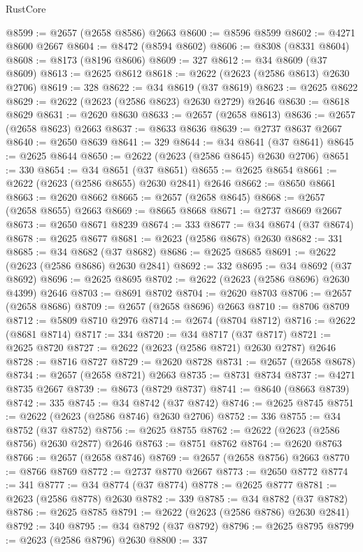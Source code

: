 \begin{lexlean}{RustCore}
\begin{coremodule}
@8599 := @2657 (@2658 @8586) @2663
@8600 := @8596 @8599
@8602 := @4271 @8600 @2667
@8604 := @8472 (@8594 @8602)
@8606 := @8308 (@8331 @8604)
@8608 := @8173 (@8196 @8606)
@8609 := 327
@8612 := @34 @8609 (@37 @8609)
@8613 := @2625 @8612
@8618 := @2622 (@2623 (@2586 @8613) @2630 @2706)
@8619 := 328
@8622 := @34 @8619 (@37 @8619)
@8623 := @2625 @8622
@8629 := @2622 (@2623 (@2586 @8623) @2630 @2729) @2646
@8630 := @8618 @8629
@8631 := @2620 @8630
@8633 := @2657 (@2658 @8613)
@8636 := @2657 (@2658 @8623) @2663
@8637 := @8633 @8636
@8639 := @2737 @8637 @2667
@8640 := @2650 @8639
@8641 := 329
@8644 := @34 @8641 (@37 @8641)
@8645 := @2625 @8644
@8650 := @2622 (@2623 (@2586 @8645) @2630 @2706)
@8651 := 330
@8654 := @34 @8651 (@37 @8651)
@8655 := @2625 @8654
@8661 := @2622 (@2623 (@2586 @8655) @2630 @2841) @2646
@8662 := @8650 @8661
@8663 := @2620 @8662
@8665 := @2657 (@2658 @8645)
@8668 := @2657 (@2658 @8655) @2663
@8669 := @8665 @8668
@8671 := @2737 @8669 @2667
@8673 := @2650 @8671 @8239
@8674 := 333
@8677 := @34 @8674 (@37 @8674)
@8678 := @2625 @8677
@8681 := @2623 (@2586 @8678) @2630
@8682 := 331
@8685 := @34 @8682 (@37 @8682)
@8686 := @2625 @8685
@8691 := @2622 (@2623 (@2586 @8686) @2630 @2841)
@8692 := 332
@8695 := @34 @8692 (@37 @8692)
@8696 := @2625 @8695
@8702 := @2622 (@2623 (@2586 @8696) @2630 @4399) @2646
@8703 := @8691 @8702
@8704 := @2620 @8703
@8706 := @2657 (@2658 @8686)
@8709 := @2657 (@2658 @8696) @2663
@8710 := @8706 @8709
@8712 := @5809 @8710 @2976
@8714 := @2674 (@8704 @8712)
@8716 := @2622 (@8681 @8714)
@8717 := 334
@8720 := @34 @8717 (@37 @8717)
@8721 := @2625 @8720
@8727 := @2622 (@2623 (@2586 @8721) @2630 @2787) @2646
@8728 := @8716 @8727
@8729 := @2620 @8728
@8731 := @2657 (@2658 @8678)
@8734 := @2657 (@2658 @8721) @2663
@8735 := @8731 @8734
@8737 := @4271 @8735 @2667
@8739 := @8673 (@8729 @8737)
@8741 := @8640 (@8663 @8739)
@8742 := 335
@8745 := @34 @8742 (@37 @8742)
@8746 := @2625 @8745
@8751 := @2622 (@2623 (@2586 @8746) @2630 @2706)
@8752 := 336
@8755 := @34 @8752 (@37 @8752)
@8756 := @2625 @8755
@8762 := @2622 (@2623 (@2586 @8756) @2630 @2877) @2646
@8763 := @8751 @8762
@8764 := @2620 @8763
@8766 := @2657 (@2658 @8746)
@8769 := @2657 (@2658 @8756) @2663
@8770 := @8766 @8769
@8772 := @2737 @8770 @2667
@8773 := @2650 @8772
@8774 := 341
@8777 := @34 @8774 (@37 @8774)
@8778 := @2625 @8777
@8781 := @2623 (@2586 @8778) @2630
@8782 := 339
@8785 := @34 @8782 (@37 @8782)
@8786 := @2625 @8785
@8791 := @2622 (@2623 (@2586 @8786) @2630 @2841)
@8792 := 340
@8795 := @34 @8792 (@37 @8792)
@8796 := @2625 @8795
@8799 := @2623 (@2586 @8796) @2630
@8800 := 337

\end{coremodule}
\end{lexlean}
